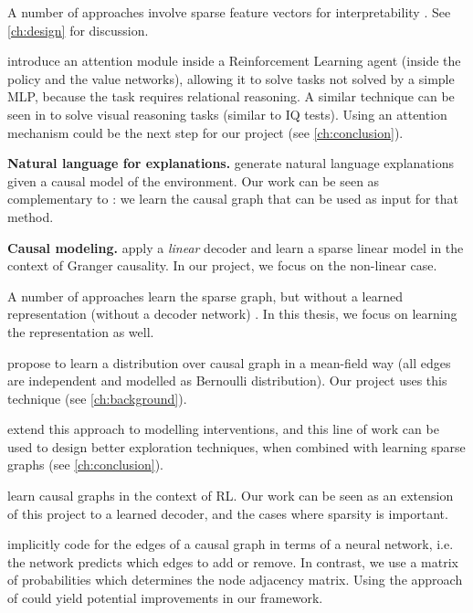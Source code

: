 \documentclass[a4paper,11pt,oneside]{report}
\begin{document}
A number of approaches involve sparse feature vectors for interpretability \cite{Weinstein,Zhu2017,VandenOord2017,Cha2018,Deng,Liu2018,Javed2019,Rafati2019,Pei2019,Lillicrap2019,Petros2020,Fallah2020,Javed2020}. See \autoref{ch:design} for discussion.

\cite{zambaldi2018relational} introduce an attention module inside a Reinforcement Learning agent (inside the policy and the value networks), allowing it to solve tasks not solved by a simple MLP, because the task requires relational reasoning. A similar technique can be seen in \cite{hahne2019attention} to solve visual reasoning tasks (similar to IQ tests).
Using an attention mechanism could be the next step for our project (see \autoref{ch:conclusion}).


{\bf Natural language for explanations.}
\cite{Madumal2019,Ehsan2018} generate natural language explanations given a causal model of the environment. Our work can be seen as complementary to \cite{Madumal2019}: we learn the causal graph that can be used as input for that method.


{\bf Causal modeling.}
\cite{Barnett2015} apply a {\em linear} decoder and learn a sparse linear model in the context of Granger causality. In our project, we focus on the non-linear case.

A number of approaches learn the sparse graph, but without a learned representation (without a decoder network) \cite{Kalainathan2018,Fu2013,Ke2019,Chalupka2017,Javed2020,Battaglia2016}. In this thesis, we focus on learning the representation as well.

\cite{Kalainathan2018, Ng2019} propose to learn a distribution over causal graph in a mean-field way (all edges are independent and modelled as Bernoulli distribution). Our project uses this technique (see \ref{ch:background}).

\cite{brouillard2020differentiable} extend this approach to modelling interventions, and this line of work can be used to design better exploration techniques, when combined with learning sparse graphs (see \autoref{ch:conclusion}).

\cite{Javed} learn causal graphs in the context of RL. Our work can be seen as an extension of this project to a learned decoder, and the cases where sparsity is important.

\cite{Nair2019} implicitly code for the edges of a causal graph in terms of a neural network, i.e. the network predicts which edges to add or remove. In contrast, we use a matrix of probabilities which determines the node adjacency matrix. Using the approach of \cite{Nair2019} could yield potential improvements in our framework.
\end{document}
